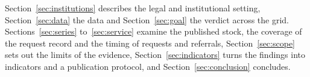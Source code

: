 Section~\ref{sec:institutions} describes the legal and institutional setting, Section~\ref{sec:data} the data and Section~\ref{sec:goal} the verdict across the grid. Sections~\ref{sec:series} to~\ref{sec:service} examine the published stock, the coverage of the request record and the timing of requests and referrals, Section~\ref{sec:scope} sets out the limits of the evidence, Section~\ref{sec:indicators} turns the findings into indicators and a publication protocol, and Section~\ref{sec:conclusion} concludes.
